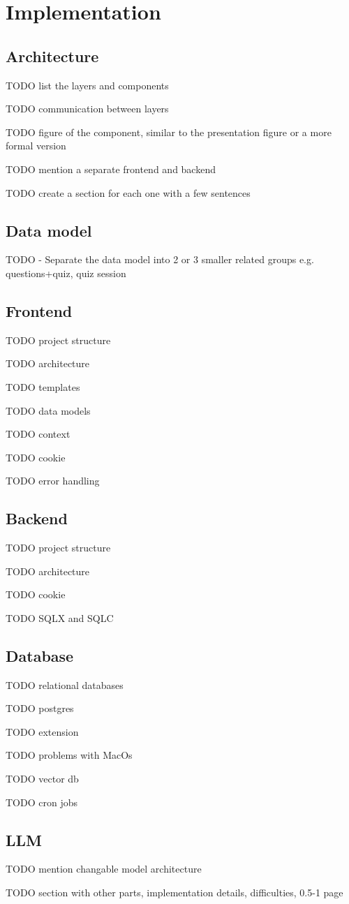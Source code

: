 \chapter{Implementation}

\section{Architecture}

TODO list the layers and components

TODO communication between layers

TODO figure of the component, similar to the presentation figure or a more formal version

TODO mention a separate frontend and backend

TODO create a section for each one with a few sentences

\section{Data model}

TODO - Separate the data model into 2 or 3 smaller related groups e.g. questions+quiz, quiz session

\section{Frontend}
TODO project structure

TODO architecture

TODO templates

TODO data models

TODO context

TODO cookie

TODO error handling

\section{Backend}
TODO project structure

TODO architecture

TODO cookie

TODO SQLX and SQLC

\section{Database}
TODO relational databases

TODO postgres

TODO extension

TODO problems with MacOs

TODO vector db

TODO cron jobs

\section{LLM}
TODO mention changable model architecture


TODO section with other parts, implementation details, difficulties, 0.5-1 page